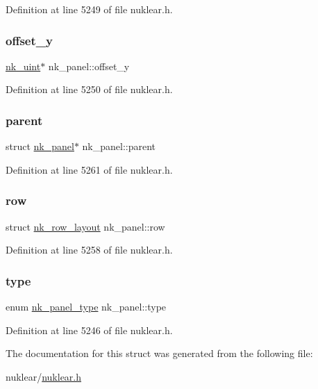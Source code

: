 Definition at line 5249 of file nuklear.\+h.

\mbox{\label{structnk__panel_a6704d6eb0414bdeaf9cba1facdb4c729}} 
\subsubsection{\texorpdfstring{offset\+\_\+y}{offset\_y}}
{\footnotesize\ttfamily \mbox{\hyperlink{nuklear_8h_a951b598a3101b6d2a55d22ac39f57919}{nk\+\_\+uint}}$\ast$ nk\+\_\+panel\+::offset\+\_\+y}



Definition at line 5250 of file nuklear.\+h.

\mbox{\label{structnk__panel_afce00b5b98ee2a0a8f274a5f626d798a}} 
\subsubsection{\texorpdfstring{parent}{parent}}
{\footnotesize\ttfamily struct \mbox{\hyperlink{structnk__panel}{nk\+\_\+panel}}$\ast$ nk\+\_\+panel\+::parent}



Definition at line 5261 of file nuklear.\+h.

\mbox{\label{structnk__panel_a9687b3e8837edcf72a16332b80e6e42e}} 
\subsubsection{\texorpdfstring{row}{row}}
{\footnotesize\ttfamily struct \mbox{\hyperlink{structnk__row__layout}{nk\+\_\+row\+\_\+layout}} nk\+\_\+panel\+::row}



Definition at line 5258 of file nuklear.\+h.

\mbox{\label{structnk__panel_a1c0a0e1bd86b8de10026106fb96787da}} 
\subsubsection{\texorpdfstring{type}{type}}
{\footnotesize\ttfamily enum \mbox{\hyperlink{nuklear_8h_ae2eaaeccb136c68814c17bbc71496b99}{nk\+\_\+panel\+\_\+type}} nk\+\_\+panel\+::type}



Definition at line 5246 of file nuklear.\+h.



The documentation for this struct was generated from the following file\+:\begin{DoxyCompactItemize}
\item 
nuklear/\mbox{\hyperlink{nuklear_8h}{nuklear.\+h}}\end{DoxyCompactItemize}
